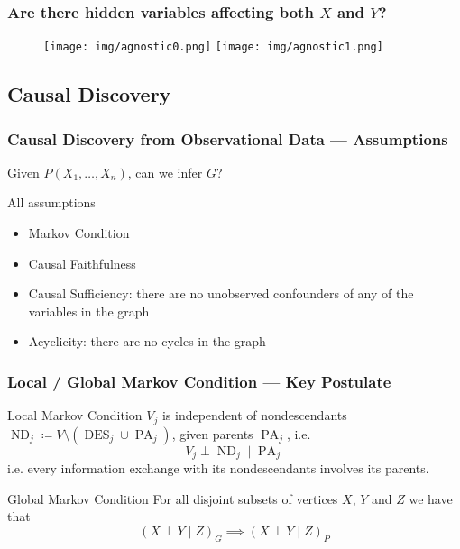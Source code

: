 \documentclass[UTF8,11pt,colorlinks,compress,openany]{beamer}%
\begin{document}
\begin{frame}\frametitle{Are there hidden variables  affecting both $X$ and $Y$?}
\begin{figure}[H]
\texttt{[image: img/agnostic0.png]}
\texttt{[image: img/agnostic1.png]}
\end{figure}
\end{frame}

\subsection{Causal Discovery}

\begin{frame}\frametitle{Causal Discovery from Observational Data --- Assumptions}
\begin{problem}
	Given $P(X_1,\dots,X_n)$, can we infer $G$?
\end{problem}
\begin{block}{All assumptions}
\begin{itemize}
	\item Markov Condition
	\item Causal Faithfulness
	\item Causal Sufficiency: there are no unobserved confounders of any of the variables in the graph
	\item Acyclicity: there are no cycles in the graph
\end{itemize}
\end{block}
\end{frame}

\begin{frame}\frametitle{Local / Global Markov Condition --- Key Postulate}
\begin{block}{Local Markov Condition}
$V_j$ is independent of nondescendants $\operatorname{ND}_j\coloneqq V\setminus(\operatorname{DES}_j\cup \operatorname{PA}_j)$, given parents $\operatorname{PA}_j$, i.e.
\[V_j\perp \operatorname{ND}_j\mid \operatorname{PA}_j\]
i.e. every information exchange with its nondescendants involves its parents.
\begin{block}{Global Markov Condition}
For all disjoint subsets of vertices $X$, $Y$ and $Z$ we have that
\[(X\perp Y\mid Z)_G\implies(X\perp Y\mid Z)_P\]
\end{block}
\end{block}
\end{frame}
\end{document}
